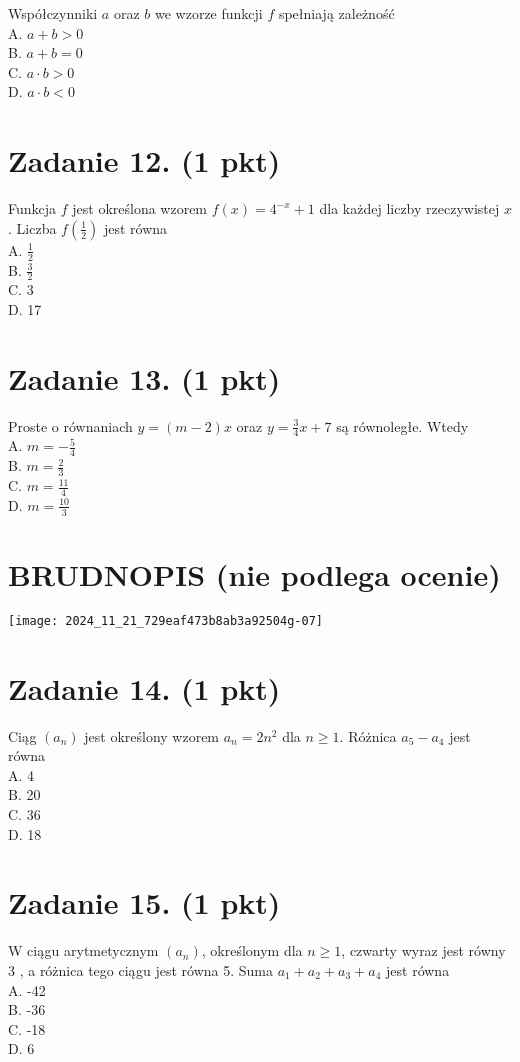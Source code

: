 \documentclass[10pt]{article}
\begin{document}
Współczynniki \(a\) oraz \(b\) we wzorze funkcji \(f\) spełniają zależność\\
A. \(a+b>0\)\\
B. \(a+b=0\)\\
C. \(a \cdot b>0\)\\
D. \(a \cdot b<0\)

\section*{Zadanie 12. (1 pkt)}
Funkcja \(f\) jest określona wzorem \(f(x)=4^{-x}+1\) dla każdej liczby rzeczywistej \(x\). Liczba \(f\left(\frac{1}{2}\right)\) jest równa\\
A. \(\frac{1}{2}\)\\
B. \(\frac{3}{2}\)\\
C. 3\\
D. 17

\section*{Zadanie 13. (1 pkt)}
Proste o równaniach \(y=(m-2) x\) oraz \(y=\frac{3}{4} x+7\) są równoległe. Wtedy\\
A. \(m=-\frac{5}{4}\)\\
B. \(m=\frac{2}{3}\)\\
C. \(m=\frac{11}{4}\)\\
D. \(m=\frac{10}{3}\)

\section*{BRUDNOPIS (nie podlega ocenie)}
\begin{center}
\texttt{[image: 2024\_11\_21\_729eaf473b8ab3a92504g-07]}
\end{center}

\section*{Zadanie 14. (1 pkt)}
Ciąg \(\left(a_{n}\right)\) jest określony wzorem \(a_{n}=2 n^{2}\) dla \(n \geq 1\). Różnica \(a_{5}-a_{4}\) jest równa\\
A. 4\\
B. 20\\
C. 36\\
D. 18

\section*{Zadanie 15. (1 pkt)}
W ciągu arytmetycznym \(\left(a_{n}\right)\), określonym dla \(n \geq 1\), czwarty wyraz jest równy 3 , a różnica tego ciągu jest równa 5. Suma \(a_{1}+a_{2}+a_{3}+a_{4}\) jest równa\\
A. -42\\
B. -36\\
C. -18\\
D. 6
\end{document}

